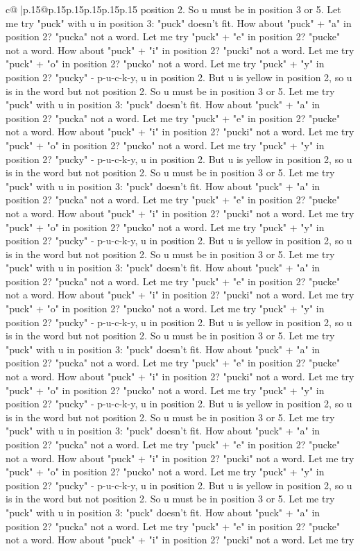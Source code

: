 \documentclass{article}
\begin{document}
{\begin{supertabular}{c@{$\;$}|p{.15\linewidth}@{}p{.15\linewidth}p{.15\linewidth}p{.15\linewidth}p{.15\linewidth}p{.15\linewidth}}
{{{position 2. So u must be in position 3 or 5. Let me try "puck" with u in position 3: "puck" doesn't fit. How about "puck" + "a" in position 2? "pucka" not a word. Let me try "puck" + "e" in position 2? "pucke" not a word. How about "puck" + "i" in position 2? "pucki" not a word. Let me try "puck" + "o" in position 2? "pucko" not a word. Let me try "puck" + "y" in position 2? "pucky" {-} p{-}u{-}c{-}k{-}y, u in position 2. But u is yellow in position 2, so u is in the word but not position 2. So u must be in position 3 or 5. Let me try "puck" with u in position 3: "puck" doesn't fit. How about "puck" + "a" in position 2? "pucka" not a word. Let me try "puck" + "e" in position 2? "pucke" not a word. How about "puck" + "i" in position 2? "pucki" not a word. Let me try "puck" + "o" in position 2? "pucko" not a word. Let me try "puck" + "y" in position 2? "pucky" {-} p{-}u{-}c{-}k{-}y, u in position 2. But u is yellow in position 2, so u is in the word but not position 2. So u must be in position 3 or 5. Let me try "puck" with u in position 3: "puck" doesn't fit. How about "puck" + "a" in position 2? "pucka" not a word. Let me try "puck" + "e" in position 2? "pucke" not a word. How about "puck" + "i" in position 2? "pucki" not a word. Let me try "puck" + "o" in position 2? "pucko" not a word. Let me try "puck" + "y" in position 2? "pucky" {-} p{-}u{-}c{-}k{-}y, u in position 2. But u is yellow in position 2, so u is in the word but not position 2. So u must be in position 3 or 5. Let me try "puck" with u in position 3: "puck" doesn't fit. How about "puck" + "a" in position 2? "pucka" not a word. Let me try "puck" + "e" in position 2? "pucke" not a word. How about "puck" + "i" in position 2? "pucki" not a word. Let me try "puck" + "o" in position 2? "pucko" not a word. Let me try "puck" + "y" in position 2? "pucky" {-} p{-}u{-}c{-}k{-}y, u in position 2. But u is yellow in position 2, so u is in the word but not position 2. So u must be in position 3 or 5. Let me try "puck" with u in position 3: "puck" doesn't fit. How about "puck" + "a" in position 2? "pucka" not a word. Let me try "puck" + "e" in position 2? "pucke" not a word. How about "puck" + "i" in position 2? "pucki" not a word. Let me try "puck" + "o" in position 2? "pucko" not a word. Let me try "puck" + "y" in position 2? "pucky" {-} p{-}u{-}c{-}k{-}y, u in position 2. But u is yellow in position 2, so u is in the word but not position 2. So u must be in position 3 or 5. Let me try "puck" with u in position 3: "puck" doesn't fit. How about "puck" + "a" in position 2? "pucka" not a word. Let me try "puck" + "e" in position 2? "pucke" not a word. How about "puck" + "i" in position 2? "pucki" not a word. Let me try "puck" + "o" in position 2? "pucko" not a word. Let me try "puck" + "y" in position 2? "pucky" {-} p{-}u{-}c{-}k{-}y, u in position 2. But u is yellow in position 2, so u is in the word but not position 2. So u must be in position 3 or 5. Let me try "puck" with u in position 3: "puck" doesn't fit. How about "puck" + "a" in position 2? "pucka" not a word. Let me try "puck" + "e" in position 2? "pucke" not a word. How about "puck" + "i" in position 2? "pucki" not a word. Let me try }}}
\end{supertabular}}
\end{document}
